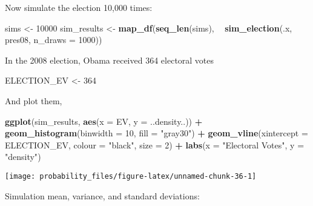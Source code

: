 \documentclass[]{book}
\newenvironment{Shaded}{\begin{snugshade}}{\end{snugshade}}
\newcommand{\CommentTok}[1]{\textcolor[rgb]{0.56,0.35,0.01}{\textit{#1}}}
\newcommand{\DataTypeTok}[1]{\textcolor[rgb]{0.13,0.29,0.53}{#1}}
\newcommand{\DecValTok}[1]{\textcolor[rgb]{0.00,0.00,0.81}{#1}}
\newcommand{\KeywordTok}[1]{\textcolor[rgb]{0.13,0.29,0.53}{\textbf{#1}}}
\newcommand{\NormalTok}[1]{#1}
\newcommand{\OperatorTok}[1]{\textcolor[rgb]{0.81,0.36,0.00}{\textbf{#1}}}
\newcommand{\StringTok}[1]{\textcolor[rgb]{0.31,0.60,0.02}{#1}}
\theoremstyle{definition}
\theoremstyle{definition}
\theoremstyle{definition}
\theoremstyle{remark}
\begin{document}
Now simulate the election 10,000 times:

\begin{Shaded}
\begin{Highlighting}[]
\NormalTok{sims <-}\StringTok{ }\DecValTok{10000}
\NormalTok{sim_results <-}\StringTok{ }\KeywordTok{map_df}\NormalTok{(}\KeywordTok{seq_len}\NormalTok{(sims), }\OperatorTok{~}\StringTok{ }\KeywordTok{sim_election}\NormalTok{(.x, pres08, }\DataTypeTok{n_draws =} \DecValTok{1000}\NormalTok{))}
\end{Highlighting}
\end{Shaded}

In the 2008 election, Obama received 364 electoral votes

\begin{Shaded}
\begin{Highlighting}[]
\NormalTok{ELECTION_EV <-}\StringTok{ }\DecValTok{364}
\end{Highlighting}
\end{Shaded}

And plot them,

\begin{Shaded}
\begin{Highlighting}[]
\KeywordTok{ggplot}\NormalTok{(sim_results, }\KeywordTok{aes}\NormalTok{(}\DataTypeTok{x =}\NormalTok{ EV, }\DataTypeTok{y =}\NormalTok{ ..density..)) }\OperatorTok{+}
\StringTok{  }\KeywordTok{geom_histogram}\NormalTok{(}\DataTypeTok{binwidth =} \DecValTok{10}\NormalTok{, }\DataTypeTok{fill =} \StringTok{"gray30"}\NormalTok{) }\OperatorTok{+}
\StringTok{  }\KeywordTok{geom_vline}\NormalTok{(}\DataTypeTok{xintercept =}\NormalTok{ ELECTION_EV, }\DataTypeTok{colour =} \StringTok{"black"}\NormalTok{, }\DataTypeTok{size =} \DecValTok{2}\NormalTok{) }\OperatorTok{+}
\StringTok{  }\KeywordTok{labs}\NormalTok{(}\DataTypeTok{x =} \StringTok{"Electoral Votes"}\NormalTok{, }\DataTypeTok{y =} \StringTok{"density"}\NormalTok{)}
\end{Highlighting}
\end{Shaded}

\begin{center}\texttt{[image: probability\_files/figure-latex/unnamed-chunk-36-1]} \end{center}

Simulation mean, variance, and standard deviations:

\begin{Shaded}
\end{Shaded}
\end{document}
